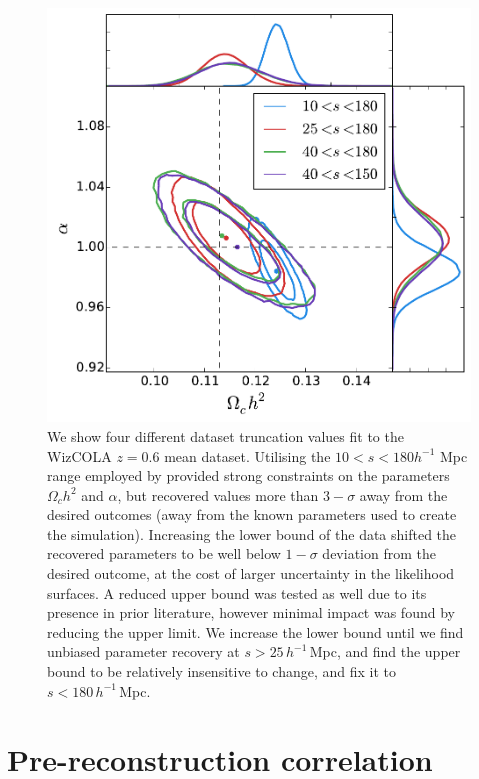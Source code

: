 \documentclass[a4paper,fleqn,usenatbib]{mnras}
\begin{document}
\begin{figure}
	\begin{center}
		\includegraphics[width=\columnwidth]{CdatasetTrunc.pdf}
	\end{center}
	\caption{We show four different dataset truncation values fit to the WizCOLA $z=0.6$ mean dataset. Utilising the $10<s<180 h^{-1}$ Mpc range employed by \citet{BlakeDavis2011} provided strong constraints on the parameters $\Omega_c h^2$ and $\alpha$, but recovered values more than $3-\sigma$ away from the desired outcomes (away from the known parameters used to create the simulation). Increasing the lower bound of the data shifted the recovered parameters to be well below $1-\sigma$ deviation from the desired outcome, at the cost of larger uncertainty in the likelihood surfaces. A reduced upper bound was tested as well due to its presence in prior literature, however minimal impact was found by reducing the upper limit. We increase the lower bound until we find unbiased parameter recovery at $s > 25\,h^{-1}\,$Mpc, and find the upper bound to be relatively insensitive to change, and fix it to $s < 180\,h^{-1}\,$Mpc. }
	\label{fig:CdatasetTrunc}
\end{figure}





\section{Pre-reconstruction correlation} \label{app:cor}
\end{document}
